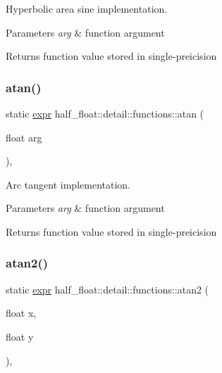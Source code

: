 Hyperbolic area sine implementation. 
\begin{DoxyParams}{Parameters}
{\em arg} & function argument \\
\hline
\end{DoxyParams}
\begin{DoxyReturn}{Returns}
function value stored in single-\/preicision 
\end{DoxyReturn}
\mbox{\label{structhalf__float_1_1detail_1_1functions_a3f0cae3135e53b5d5197f667da683879}} 
\subsubsection{\texorpdfstring{atan()}{atan()}}
{\footnotesize\ttfamily static \hyperlink{structhalf__float_1_1detail_1_1expr}{expr} half\+\_\+float\+::detail\+::functions\+::atan (\begin{DoxyParamCaption}\item[{float}]{arg }\end{DoxyParamCaption})\hspace{0.3cm}{\ttfamily [inline]}, {\ttfamily [static]}}

Arc tangent implementation. 
\begin{DoxyParams}{Parameters}
{\em arg} & function argument \\
\hline
\end{DoxyParams}
\begin{DoxyReturn}{Returns}
function value stored in single-\/preicision 
\end{DoxyReturn}
\mbox{\label{structhalf__float_1_1detail_1_1functions_af8ac17386217cf681433dff7d176af32}} 
\subsubsection{\texorpdfstring{atan2()}{atan2()}}
{\footnotesize\ttfamily static \hyperlink{structhalf__float_1_1detail_1_1expr}{expr} half\+\_\+float\+::detail\+::functions\+::atan2 (\begin{DoxyParamCaption}\item[{float}]{x,  }\item[{float}]{y }\end{DoxyParamCaption})\hspace{0.3cm}{\ttfamily [inline]}, {\ttfamily [static]}}

